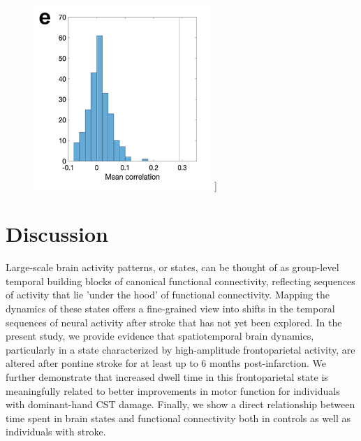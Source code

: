 \documentclass[phd,tocprelim]{cornell}
\renewcommand{\caption}[1]{\singlespacing\hangcaption{#1}\normalspacing}
\begin{document}
\null
\vfill
\clearpage    
    \null
\vfill
\begin{figure}[h!]
		\ContinuedFloat
		\captionsetup{labelformat=adja-page}
    \centering
    \includegraphics[width=0.6\textwidth]{chapter2/Figure6e.png}
    \caption[]{}
\end{figure}
\null
\vfill
\clearpage    

\section{Discussion}
Large-scale brain activity patterns, or states, can be thought of as group-level temporal building blocks of canonical functional connectivity, reflecting sequences of activity that lie 'under the hood' of functional connectivity. Mapping the dynamics of these states offers a fine-grained view into shifts in the temporal sequences of neural activity after stroke that has not yet been explored. In the present study, we provide evidence that spatiotemporal brain dynamics, particularly in a state characterized by high-amplitude frontoparietal activity, are altered after pontine stroke for at least up to 6 months post-infarction. We further demonstrate that increased dwell time in this frontoparietal state is meaningfully related to better improvements in motor function for individuals with dominant-hand CST damage. Finally, we show a direct relationship between time spent in brain states and functional connectivity both in controls as well as individuals with stroke.
\end{document}
